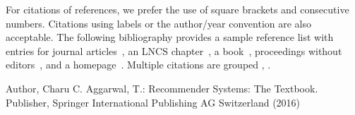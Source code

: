\documentclass[runningheads]{llncs}
\begin{document}


\newpage
\hfill










\newpage
For citations of references, we prefer the use of square brackets
and consecutive numbers. Citations using labels or the author/year
convention are also acceptable. The following bibliography provides
a sample reference list with entries for journal
articles~\cite{ref_article1}, an LNCS chapter~\cite{ref_lncs1}, a
book~\cite{ref_book1}, proceedings without editors~\cite{ref_proc1},
and a homepage~\cite{ref_url1}. Multiple citations are grouped
\cite{ref_article1,ref_lncs1,ref_book1},
\cite{ref_article1,ref_book1,ref_proc1,ref_url1}.
%
%
%
% 
% 
%
\begin{thebibliography}{8}

Author, Charu C. Aggarwal, T.: Recommender Systems: The Textbook. Publisher, Springer International Publishing AG Switzerland (2016)


\end{thebibliography}
\end{document}

